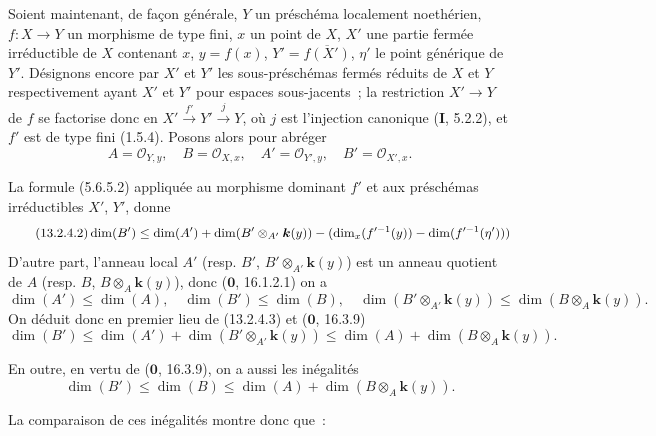 \begin{env}[13.2.4]
\label{IV.13.2.4-fr}
Soient maintenant, de façon générale, $Y$ un préschéma localement noethérien,
$f:X\to Y$ un morphisme de type fini, $x$ un point de $X$, $X'$ une partie
fermée irréductible de $X$ contenant $x$, $y=f(x)$,
$Y'=\overline{f(X')}$, $\eta'$ le point générique de $Y'$. Désignons encore
par $X'$ et $Y'$ les sous-préschémas fermés réduits de $X$ et $Y$
respectivement ayant $X'$ et $Y'$ pour espaces sous-jacents~; la restriction
$X'\to Y$ de $f$ se factorise donc en
$X'\xrightarrow{f'}Y'\xrightarrow{j}Y$, où $j$ est l'injection canonique
(\textbf{I}, 5.2.2), et $f'$ est de type fini (1.5.4). Posons alors pour
abréger
\[
\tag{13.2.4.1}
\label{IV.13.2.4.1-fr}
  A=\mathcal O_{Y,y},\quad B=\mathcal O_{X,x},\quad
  A'=\mathcal O_{Y',y},\quad B'=\mathcal O_{X',x}.
\]

La formule (5.6.5.2) appliquée au morphisme dominant $f'$ et aux préschémas
irréductibles $X'$, $Y'$, donne
\[
\tag{13.2.4.2}
\label{IV.13.2.4.2-fr}
  \dim(B')\leq\dim(A')+\dim(B'\otimes_{A'}\boldsymbol{k}(y))
  -(\dim_x(f'^{-1}(y))-\dim(f'^{-1}(\eta')))
\]
D'autre part, l'anneau local $A'$ (resp. $B'$, $B'\otimes_{A'}\boldsymbol{k}(y)$) est un
anneau quotient de $A$ (resp. $B$, $B\otimes_A\boldsymbol{k}(y)$), donc
($\mathbf 0$, 16.1.2.1) on a
\[
\tag{13.2.4.3}
\label{IV.13.2.4.3-fr}
  \dim(A')\leq\dim(A),\quad \dim(B')\leq\dim(B),\quad
  \dim(B'\otimes_{A'}\boldsymbol{k}(y))\leq\dim(B\otimes_A\boldsymbol{k}(y)).
\]
On déduit donc en premier lieu de (13.2.4.3) et ($\mathbf 0$, 16.3.9)
\[
\tag{13.2.4.4}
\label{IV.13.2.4.4-fr}
  \dim(B')\leq\dim(A')+\dim(B'\otimes_{A'}\boldsymbol{k}(y))
  \leq\dim(A)+\dim(B\otimes_A\boldsymbol{k}(y)).
\]

En outre, en vertu de ($\mathbf 0$, 16.3.9), on a aussi les inégalités
\[
\tag{13.2.4.5}
\label{IV.13.2.4.5-fr}
  \dim(B')\leq\dim(B)\leq\dim(A)+\dim(B\otimes_A\boldsymbol{k}(y)).
\]
\end{env}

La comparaison de ces inégalités montre donc que~:

